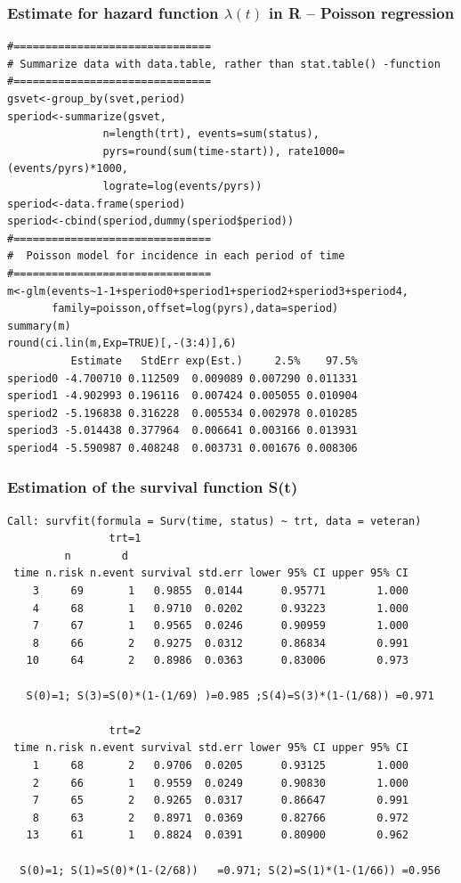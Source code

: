 \documentclass[12pt]{beamer}
\begin{document}
\begin{frame}[fragile]
\frametitle{Estimate for hazard function $\lambda(t)$ in R \newline
-- Poisson regression}

{\scriptsize 
\begin{verbatim}
#===============================
# Summarize data with data.table, rather than stat.table() -function 
#===============================
gsvet<-group_by(svet,period)
speriod<-summarize(gsvet, 
               n=length(trt), events=sum(status),
               pyrs=round(sum(time-start)), rate1000=(events/pyrs)*1000,
               lograte=log(events/pyrs))
speriod<-data.frame(speriod)
speriod<-cbind(speriod,dummy(speriod$period))
#===============================
#  Poisson model for incidence in each period of time
#===============================
m<-glm(events~1-1+speriod0+speriod1+speriod2+speriod3+speriod4,
       family=poisson,offset=log(pyrs),data=speriod)
summary(m)
round(ci.lin(m,Exp=TRUE)[,-(3:4)],6)
          Estimate   StdErr exp(Est.)     2.5%    97.5%
speriod0 -4.700710 0.112509  0.009089 0.007290 0.011331
speriod1 -4.902993 0.196116  0.007424 0.005055 0.010904
speriod2 -5.196838 0.316228  0.005534 0.002978 0.010285
speriod3 -5.014438 0.377964  0.006641 0.003166 0.013931
speriod4 -5.590987 0.408248  0.003731 0.001676 0.008306
\end{verbatim}
}
\end{frame}

\begin{frame}[fragile]
\frametitle{Estimation of the survival function S(t)}

{\scriptsize \begin{verbatim}
Call: survfit(formula = Surv(time, status) ~ trt, data = veteran)
                trt=1 
         n        d
 time n.risk n.event survival std.err lower 95% CI upper 95% CI
    3     69       1   0.9855  0.0144      0.95771        1.000
    4     68       1   0.9710  0.0202      0.93223        1.000
    7     67       1   0.9565  0.0246      0.90959        1.000
    8     66       2   0.9275  0.0312      0.86834        0.991
   10     64       2   0.8986  0.0363      0.83006        0.973
   
   S(0)=1; S(3)=S(0)*(1-(1/69) )=0.985 ;S(4)=S(3)*(1-(1/68)) =0.971

                trt=2 
 time n.risk n.event survival std.err lower 95% CI upper 95% CI
    1     68       2   0.9706  0.0205      0.93125        1.000
    2     66       1   0.9559  0.0249      0.90830        1.000
    7     65       2   0.9265  0.0317      0.86647        0.991
    8     63       2   0.8971  0.0369      0.82766        0.972
   13     61       1   0.8824  0.0391      0.80900        0.962   
   
  S(0)=1; S(1)=S(0)*(1-(2/68))   =0.971; S(2)=S(1)*(1-(1/66)) =0.956
   
\end{verbatim}
}
\end{frame}
\end{document}
